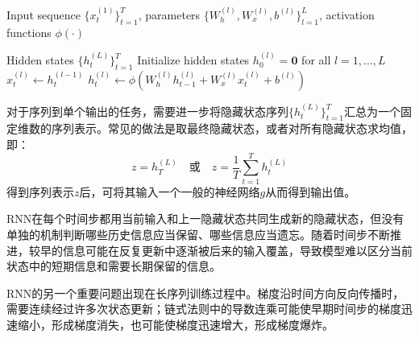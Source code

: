 \begin{algorithm}[H]
	\caption{Forward Propagation of a Multi-layer RNN}
	\begin{algorithmic}[1]
		
		\Require Input sequence $\{x_t^{(1)}\}_{t=1}^T$, 
		parameters $\{W_h^{(l)}, W_x^{(l)}, b^{(l)}\}_{l=1}^{L}$, 
		activation functions $\phi(\cdot)$
		
		\Ensure Hidden states $\{h_t^{(L)}\}_{t=1}^{T}$
		\State Initialize hidden states $h_0^{(l)} = \mathbf{0}$ for all $l = 1,\dots,L$
		   
		  
		\State $x_t^{(l)} \gets h_t^{(l-1)}$ 
		\EndIf
		\State $h_t^{(l)}\gets\phi\left(W_h^{(l)}h_{t-1}^{(l)}+W_x^{(l)}x_t^{(l)}+b^{(l)}\right)$
		\EndFor
		\EndFor
	\end{algorithmic}
\end{algorithm}
对于序列到单个输出的任务，需要进一步将隐藏状态序列$\{h_t^{(L)}\}_{t=1}^{T}$汇总为一个固定维数的序列表示。常见的做法是取最终隐藏状态，或者对所有隐藏状态求均值，即：
\begin{equation*}
	z=h_T^{(L)}\quad\text{或}\quad z=\frac{1}{T}\sum_{t=1}^Th_t^{(L)}
\end{equation*}
得到序列表示$z$后，可将其输入一个一般的神经网络$g$从而得到输出值。
\begin{note}
	RNN在每个时间步都用当前输入和上一隐藏状态共同生成新的隐藏状态，但没有单独的机制判断哪些历史信息应当保留、哪些信息应当遗忘。随着时间步不断推进，较早的信息可能在反复更新中逐渐被后来的输入覆盖，导致模型难以区分当前状态中的短期信息和需要长期保留的信息。\par
	RNN的另一个重要问题出现在长序列训练过程中。梯度沿时间方向反向传播时，需要连续经过许多次状态更新；链式法则中的导数连乘可能使早期时间步的梯度迅速缩小，形成梯度消失，也可能使梯度迅速增大，形成梯度爆炸。
\end{note}
